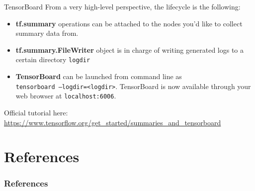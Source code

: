 \documentclass[aspectratio=169]{beamer}
\begin{document}
\begin{frame}{TensorBoard}
From a very high-level perspective, the lifecycle is the following:
\begin{itemize}
\item \textbf{tf.summary} operations can be attached to the nodes you'd like to collect summary data from.
\item \textbf{tf.summary.FileWriter} object is in charge of writing generated logs to a certain directory \texttt{logdir}
\item \textbf{TensorBoard} can be launched from command line as\\
\texttt{tensorboard --logdir=<logdir>}. TensorBoard is now available through your web browser at \texttt{localhost:6006}.
\end{itemize}
Official tutorial here: \url{https://www.tensorflow.org/get_started/summaries_and_tensorboard}
\end{frame}


\section{References}

\begin{frame}[t, allowframebreaks]
\frametitle{References}


\end{frame}
\end{document}
